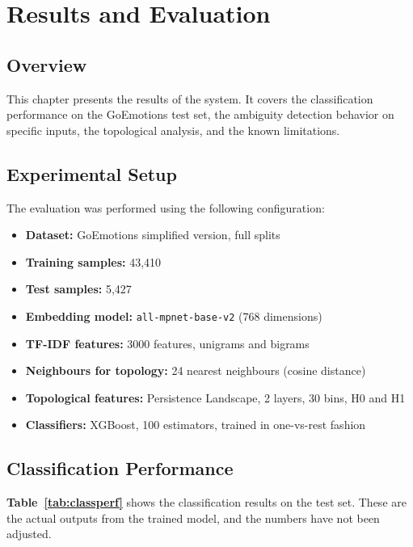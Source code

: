 \chapter{Results and Evaluation}
\sloppy

\section{Overview}

This chapter presents the results of the system. It covers the classification performance on
the GoEmotions test set, the ambiguity detection behavior on specific inputs, the topological
analysis, and the known limitations.

\section{Experimental Setup}

The evaluation was performed using the following configuration:

\begin{itemize}
    \item \textbf{Dataset:} GoEmotions simplified version, full splits
    \item \textbf{Training samples:} 43,410
    \item \textbf{Test samples:} 5,427
    \item \textbf{Embedding model:} \texttt{all-mpnet-base-v2} (768 dimensions)
    \item \textbf{TF-IDF features:} 3000 features, unigrams and bigrams
    \item \textbf{Neighbours for topology:} 24 nearest neighbours (cosine distance)
    \item \textbf{Topological features:} Persistence Landscape, 2 layers, 30 bins, H0 and H1
    \item \textbf{Classifiers:} XGBoost, 100 estimators, trained in one-vs-rest fashion
\end{itemize}

\section{Classification Performance}

\textbf{Table~\ref{tab:classperf}} shows the classification results on the test set. These are the actual
outputs from the trained model, and the numbers have not been adjusted.


